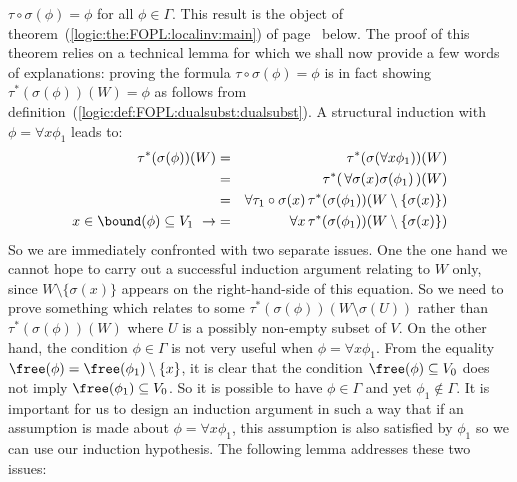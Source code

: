$\tau\circ\sigma(\phi)=\phi$ for all $\phi\in\Gamma$. This result is
the object of theorem~(\ref{logic:the:FOPL:localinv:main}) of
page~\pageref{logic:the:FOPL:localinv:main} below. The proof of this
theorem relies on a technical lemma for which we shall now provide a
few words of explanations: proving the formula
$\tau\circ\sigma(\phi)=\phi$ is in fact showing
$\tau^{*}(\sigma(\phi))(W)=\phi$ as follows from
definition~(\ref{logic:def:FOPL:dualsubst:dualsubst}). A structural
induction with $\phi=\forall x\phi_{1}$ leads to:
    \begin{eqnarray*}
    \tau^{*}(\sigma(\phi))(W)&=&\tau^{*}(\sigma(\forall
    x\phi_{1}))(W)\\
    &=&\tau^{*}(\,\forall
    \sigma(x)\sigma(\phi_{1})\,)(W)\\
    &=&\forall
    \tau_{1}\circ\sigma(x)\,\tau^{*}(\sigma(\phi_{1}))(W\setminus\{\sigma(x)\})\\
    x\in\bound(\phi)\subseteq V_{1}\ \rightarrow
    &=&\forall x\,\tau^{*}(\sigma(\phi_{1}))(W\setminus\{\sigma(x)\})
    \end{eqnarray*}
So we are immediately confronted with two separate issues. One the
one hand we cannot hope to carry out a successful induction argument
relating to $W$ only, since $W\setminus\{\sigma(x)\}$ appears on the
right-hand-side of this equation. So we need to prove something
which relates to some $\tau^{*}(\sigma(\phi))(W\setminus\sigma(U))$
rather than $\tau^{*}(\sigma(\phi))(W)$ where $U$ is a possibly
non-empty subset of $V$. On the other hand, the condition
$\phi\in\Gamma$ is not very useful when $\phi=\forall x\phi_{1}$.
From the equality $\free(\phi)=\free(\phi_{1})\setminus\{x\}$, it is
clear that the condition $\free(\phi)\subseteq V_{0}$ does not imply
$\free(\phi_{1})\subseteq V_{0}$. So it is possible to have
$\phi\in\Gamma$ and yet $\phi_{1}\not\in\Gamma$. It is important for
us to design an induction argument in such a way that if an
assumption is made about $\phi=\forall x\phi_{1}$, this assumption
is also satisfied by $\phi_{1}$ so we can use our induction
hypothesis. The following lemma addresses these two issues:

